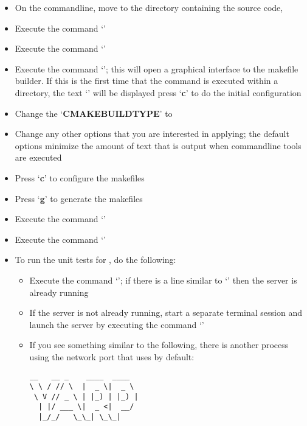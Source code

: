 \begin{itemize}
\item On the command\longDash{}line, move to the directory containing the \mplusm{} source
code, 
\item\exSp{}Execute the command `'
\item\exSp{}Execute the command `'
\item\exSp{}Execute the command `'; this will open a graphical interface
to the makefile builder. If this is the first time that the command is executed within a
directory, the text `' will be displayed \longDash{} press
`\textbf{c}' to do the initial configuration
\item\exSp{}Change the `\textbf{CMAKE\fUS{}BUILD\fUS{}TYPE}' to 
\item\exSp{}Change any other options that you are interested in applying; the default
options minimize the amount of text that is output when \mplusm{} command\longDash{}line
tools are executed
\item\exSp{}Press `\textbf{c}' to configure the makefiles
\item\exSp{}Press `\textbf{g}' to generate the makefiles
\item\exSp{}Execute the command `'
\item\exSp{}Execute the command `'
\item\exSp{}To run the unit tests for \mplusm, do the following:
\begin{itemize}
\item Execute the command `'; if there is a line
similar to `' then the \yarp{}
server is already running
\item\exSp{}If the \yarp{} server is not already running, start a separate terminal
session and launch the \yarp{} server by executing the command `'
\item\exSp{}If you see something similar to the following, there is another process using
the network port that \yarp{} uses by default:
\outputBegin
\begin{verbatim}
__   __ _    ____  ____  
\ \ / // \  |  _ \|  _ \ 
 \ V // _ \ | |_) | |_) |
  | |/ ___ \|  _ <|  __/ 
  |_/_/   \_\_| \_\_|    


\end{verbatim}
\end{itemize}
\end{itemize}
